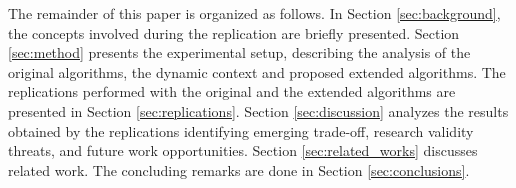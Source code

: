 The remainder of this paper is organized as follows. In Section \ref{sec:background}, the concepts involved during the replication are briefly presented. Section \ref{sec:method} presents the experimental setup, describing the analysis of the original algorithms, the dynamic context and proposed extended algorithms. The replications performed with the original and the extended algorithms are presented in Section \ref{sec:replications}. Section \ref{sec:discussion} analyzes the results obtained by the replications identifying emerging trade-off, research validity threats, and future work opportunities. Section \ref{sec:related_works} discusses related work. The concluding remarks are done in Section \ref{sec:conclusions}.